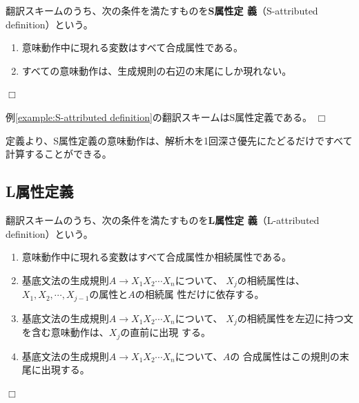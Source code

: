 \begin{definition}
 翻訳スキームのうち、次の条件を満たすものを{\bfseries S属性定
 義}（S-attributed definition）という。
 \begin{enumerate}
  \item 意味動作中に現れる変数はすべて合成属性である。
  \item すべての意味動作は、生成規則の右辺の末尾にしか現れない。
 \end{enumerate}$\Box$
\end{definition}

\begin{example}
 例\ref{example:S-attributed definition}の翻訳スキームはS属性定義である。
 $\Box$
\end{example}

定義より、S属性定義の意味動作は、解析木を1回深さ優先にたどるだけですべて
計算することができる。

\subsection{L属性定義}

\begin{definition}
 翻訳スキームのうち、次の条件を満たすものを{\bfseries L属性定
 義}（L-attributed definition）という。
 \begin{enumerate}
  \item 意味動作中に現れる変数はすべて合成属性か相続属性である。
	\label{153250_7Apr06}
  \item 基底文法の生成規則$A \rightarrow X_1X_2\cdots X_n$について、
	$X_j$の相続属性は、$X_1, X_2, \cdots, X_{j-1}$の属性と$A$の相続属
	性だけに依存する。
  \item 基底文法の生成規則$A \rightarrow X_1X_2\cdots X_n$について、
	$X_j$の相続属性を左辺に持つ文を含む意味動作は、$X_j$の直前に出現
	する。
  \item 基底文法の生成規則$A \rightarrow X_1X_2\cdots X_n$について、$A$の
	合成属性はこの規則の末尾に出現する。
	\label{153257_7Apr06}
 \end{enumerate}$\Box$
 \label{def:L-attributed definition}
\end{definition}

